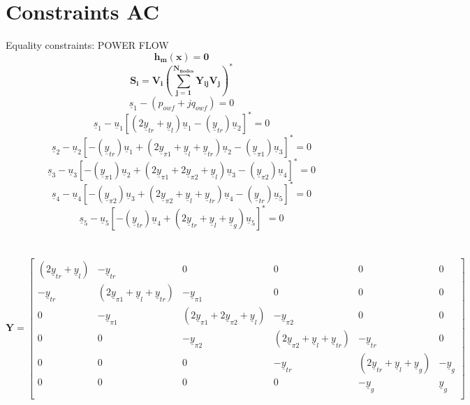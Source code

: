 \documentclass{article}
\begin{document}
\section{Constraints AC}
Equality constraints: POWER FLOW
\\
\[\mathbf{h_m(x)=0}\]
\[\mathbf{S_i=V_i(\sum_{j=1}^{N_{nodes}}Y_{ij}V_j)^*}\]
\[\underline{s}_1-(p_{owf}+jq_{owf})=0\]
\[\underline{s}_1-\underline{u}_1[(2\underline{y}_{tr}+\underline{y}_l)\underline{u}_1-(\underline{y}_{tr})\underline{u}_2]^*=0\]
\[\underline{s}_2-\underline{u}_2[-(\underline{y}_{tr})\underline{u}_1+(2\underline{y}_{\pi1}+\underline{y}_l+\underline{y}_{tr})\underline{u}_2-(\underline{y}_{\pi1})\underline{u}_3]^*=0\]
 \[\underline{s}_3-\underline{u}_3[-(\underline{y}_{\pi1})\underline{u}_2+(2\underline{y}_{\pi1}+2\underline{y}_{\pi2}+\underline{y}_{l})\underline{u}_3-(\underline{y}_{\pi2})\underline{u}_4]^*=0\]
 \[\underline{s}_4-\underline{u}_4[-(\underline{y}_{\pi2})\underline{u}_3+(2\underline{y}_{\pi2}+\underline{y}_l+\underline{y}_{tr})\underline{u}_4-(\underline{y}_{tr})\underline{u}_5]^*=0\]
 \[\underline{s}_5-\underline{u}_5[-(\underline{y}_{tr})\underline{u}_4+(2\underline{y}_{tr}+\underline{y}_l+\underline{y}_{g})\underline{u}_5]^*=0\]\\\\
 \[\mathbf{Y}=\begin{bmatrix}
 (2\underline{y}_{tr}+\underline{y}_l) & -\underline{y}_{tr} & 0 & 0 & 0 & 0\\
-\underline{y}_{tr} & (2\underline{y}_{\pi1}+\underline{y}_l+\underline{y}_{tr}) & -\underline{y}_{\pi1} & 0 & 0 & 0  \\
0 & -\underline{y}_{\pi1} & (2\underline{y}_{\pi1}+2\underline{y}_{\pi2}+\underline{y}_{l}) & -\underline{y}_{\pi2}   & 0 & 0 \\
0 & 0 & -\underline{y}_{\pi2} & (2\underline{y}_{\pi2}+\underline{y}_l+\underline{y}_{tr}) & -\underline{y}_{tr} & 0  \\
0 & 0 & 0 & -\underline{y}_{tr} & (2\underline{y}_{tr}+\underline{y}_l+\underline{y}_{g}) & -\underline{y}_{g}  \\
0 & 0 & 0 & 0 & -\underline{y}_{g} & \underline{y}_{g}\\
\end{bmatrix}\] \\



\end{document}
